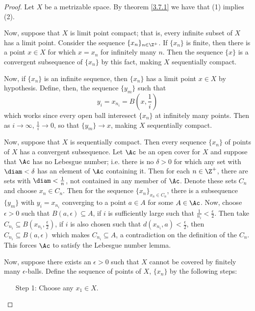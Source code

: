 \begin{proof}
    Let $X$ be a metrizable space. By theorem \ref{3.7.1} we have that (1)
    implies (2).

    Now, suppose that $X$ is limit point compact; that is, every infinite subset
    of  $X$ has a limit point. Consider the sequence  $\{x_n\}_{n \in \Z^+}$. If
    $\{x_n\}$ is finite, then there is a point $x \in X$ for which  $x=x_n$  for
    infinitely many $n$. Then the sequence  $\{x\}$ is a convergent subsequence
    of $\{x_n\}$ by this fact, making $X$ sequentially compact.

    Now, if  $\{x_n\}$ is an infinite sequence, then $\{x_n\}$ has a limit point
    $x \in X$ by hypothesis. Define, then, the sequence $\{y_m\}$ such that
    \begin{equation*}
        y_i=x_{n_i}=B(x,\frac{1}{i})
    \end{equation*}
    which works since every open ball interesect $\{x_n\}$ at infinitely many
    points. Then as $i \rightarrow \infty$, $\frac{1}{i} \rightarrow 0$, so that
    $\{y_m\} \rightarrow x$, making $X$ sequentially compact.

    Now, suppose that  $X$ is sequentially compact. Then every sequence
    $\{x_n\}$ of points of $X$ has a convergent subsequence. Let  $\Ac$ be an
    open cover for  $X$ and suppose that  $\Ac$ has no Lebesgue number; i.e.
    there is no  $\delta>0$ for which any set with $\diam<\delta$ has an element
    of  $\Ac$ containing it. Then for each  $n \in \Z^+$, there are sets with
    $\diam<\frac{1}{n}$, not contained in any member of $\Ac$. Denote these sets
    $C_n$ and choose $x_n \in C_n$. Then for the sequence  $\{x_n\}_{x_n \in
    C_n}$, there is a subsequence $\{y_m\}$ with $y_i=x_{n_i}$ converging to a
    point $a \in A$ for some $A \in \Ac$. Now, choose $\epsilon>0$ such that
    $B(a,\epsilon) \subseteq A$, if $i$ is sufficiently large such that
    $\frac{1}{n_i}<\frac{\epsilon}{2}$. Then take $C_{n_i} \subseteq
    B(x_{n_i},\frac{\epsilon}{2})$, if $i$ is also chosen such that
    $d(x_{n_i},a)<\frac{\epsilon}{2}$, then $C_{n_i} \subseteq B(a,\epsilon)$
    which makes $C_{n_i} \subseteq A$, a contradiction on the definition of the
    $C_n$. This forces $\Ac$ to satisfy the Lebesgue number lemma.

    Now, suppose there exists an $\epsilon>0$ such that $X$ cannot be covered by
    finitely many  $\epsilon$-balls. Define the sequence of points of $X$,
    $\{x_n\}$ by the following steps:
    \begin{enumerate}
        \item[Step 1:] Choose any $x_1 \in X$.


\end{enumerate}
\end{proof}
